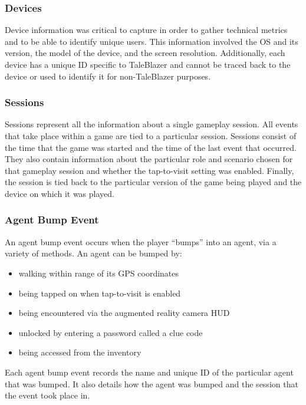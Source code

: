 \subsubsection{Devices}
\label{subsec:device}

Device information was critical to capture in order to gather technical metrics and to be able to identify unique users. This information involved the OS and its version, the model of the device, and the screen resolution. Additionally, each device has a unique ID specific to TaleBlazer and cannot be traced back to the device or used to identify it for non-TaleBlazer purposes.

\subsubsection{Sessions}
\label{subsec:session}

Sessions represent all the information about a single gameplay session. All events that take place within a game are tied to a particular session. Sessions consist of the time that the game was started and the time of the last event that occurred. They also contain information about the particular role and scenario chosen for that gameplay session and whether the tap-to-visit setting was enabled. Finally, the session is tied back to the particular version of the game being played and the device on which it was played.

\subsubsection{Agent Bump Event}

An agent bump event occurs when the player ``bumps'' into an agent, via a variety of methods. An agent can be bumped by:
	\begin{itemize}
		\item walking within range of its GPS coordinates
		\item being tapped on when tap-to-visit is enabled
		\item being encountered via the augmented reality camera HUD
		\item unlocked by entering a password called a clue code
		\item being accessed from the inventory
	\end{itemize}

Each agent bump event records the name and unique ID of the particular agent that was bumped. It also details how the agent was bumped and the session that the event took place in.

